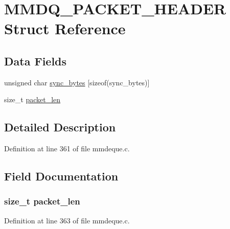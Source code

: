 \hypertarget{struct_m_m_d_q___p_a_c_k_e_t___h_e_a_d_e_r}{\section{M\-M\-D\-Q\-\_\-\-P\-A\-C\-K\-E\-T\-\_\-\-H\-E\-A\-D\-E\-R Struct Reference}
\label{struct_m_m_d_q___p_a_c_k_e_t___h_e_a_d_e_r}
}
\subsection*{Data Fields}
\begin{DoxyCompactItemize}
\item 
unsigned char \hyperlink{struct_m_m_d_q___p_a_c_k_e_t___h_e_a_d_e_r_a4b071bbf2d16a4bd21fb93a793379b29}{sync\-\_\-bytes} \mbox{[}sizeof(sync\-\_\-bytes)\mbox{]}
\item 
size\-\_\-t \hyperlink{struct_m_m_d_q___p_a_c_k_e_t___h_e_a_d_e_r_aed088ff8231fceddd2b766aa5b6bf85d}{packet\-\_\-len}
\end{DoxyCompactItemize}


\subsection{Detailed Description}


Definition at line 361 of file mmdeque.\-c.



\subsection{Field Documentation}
\hypertarget{struct_m_m_d_q___p_a_c_k_e_t___h_e_a_d_e_r_aed088ff8231fceddd2b766aa5b6bf85d}{
\subsubsection[{packet\-\_\-len}]{\setlength{\rightskip}{0pt plus 5cm}size\-\_\-t packet\-\_\-len}}\label{struct_m_m_d_q___p_a_c_k_e_t___h_e_a_d_e_r_aed088ff8231fceddd2b766aa5b6bf85d}


Definition at line 363 of file mmdeque.\-c.

